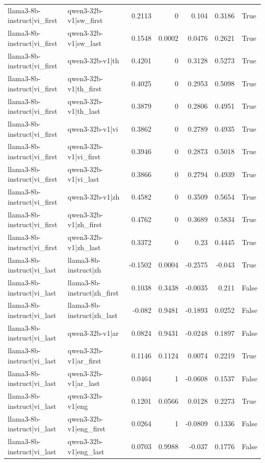 \begin{table}
\begin{tabular}{l l r r r r l}
llama3-8b-instruct|vi_first & qwen3-32b-v1|sw_first & 0.2113 & 0 & 0.104 & 0.3186 & True \\
llama3-8b-instruct|vi_first & qwen3-32b-v1|sw_last & 0.1548 & 0.0002 & 0.0476 & 0.2621 & True \\
llama3-8b-instruct|vi_first & qwen3-32b-v1|th & 0.4201 & 0 & 0.3128 & 0.5273 & True \\
llama3-8b-instruct|vi_first & qwen3-32b-v1|th_first & 0.4025 & 0 & 0.2953 & 0.5098 & True \\
llama3-8b-instruct|vi_first & qwen3-32b-v1|th_last & 0.3879 & 0 & 0.2806 & 0.4951 & True \\
llama3-8b-instruct|vi_first & qwen3-32b-v1|vi & 0.3862 & 0 & 0.2789 & 0.4935 & True \\
llama3-8b-instruct|vi_first & qwen3-32b-v1|vi_first & 0.3946 & 0 & 0.2873 & 0.5018 & True \\
llama3-8b-instruct|vi_first & qwen3-32b-v1|vi_last & 0.3866 & 0 & 0.2794 & 0.4939 & True \\
llama3-8b-instruct|vi_first & qwen3-32b-v1|zh & 0.4582 & 0 & 0.3509 & 0.5654 & True \\
llama3-8b-instruct|vi_first & qwen3-32b-v1|zh_first & 0.4762 & 0 & 0.3689 & 0.5834 & True \\
llama3-8b-instruct|vi_first & qwen3-32b-v1|zh_last & 0.3372 & 0 & 0.23 & 0.4445 & True \\
llama3-8b-instruct|vi_last & llama3-8b-instruct|zh & -0.1502 & 0.0004 & -0.2575 & -0.043 & True \\
llama3-8b-instruct|vi_last & llama3-8b-instruct|zh_first & 0.1038 & 0.3438 & -0.0035 & 0.211 & False \\
llama3-8b-instruct|vi_last & llama3-8b-instruct|zh_last & -0.082 & 0.9481 & -0.1893 & 0.0252 & False \\
llama3-8b-instruct|vi_last & qwen3-32b-v1|ar & 0.0824 & 0.9431 & -0.0248 & 0.1897 & False \\
llama3-8b-instruct|vi_last & qwen3-32b-v1|ar_first & 0.1146 & 0.1124 & 0.0074 & 0.2219 & True \\
llama3-8b-instruct|vi_last & qwen3-32b-v1|ar_last & 0.0464 & 1 & -0.0608 & 0.1537 & False \\
llama3-8b-instruct|vi_last & qwen3-32b-v1|eng & 0.1201 & 0.0566 & 0.0128 & 0.2273 & True \\
llama3-8b-instruct|vi_last & qwen3-32b-v1|eng_first & 0.0264 & 1 & -0.0809 & 0.1336 & False \\
llama3-8b-instruct|vi_last & qwen3-32b-v1|eng_last & 0.0703 & 0.9988 & -0.037 & 0.1776 & False \\

\end{tabular}
\end{table}
